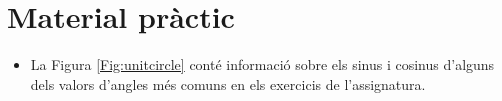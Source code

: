 \documentclass[12pt]{article}
\begin{document}
\begin{ExerciseList}
% 
% 
% 
% 
% 
% 
% 
% 
% 
% 
% 
% 
% 
% 
% 
% 
% 
% 
% 
% 
% 
% 
% 
% 
% 
% 
\end{ExerciseList}
\newpage
\section{Material pràctic}

\begin{itemize}
    \item La Figura \ref{Fig:unitcircle} conté informació sobre els sinus i cosinus d'alguns dels valors d'angles més comuns en els exercicis de l'assignatura.
\end{itemize}
\end{document}
